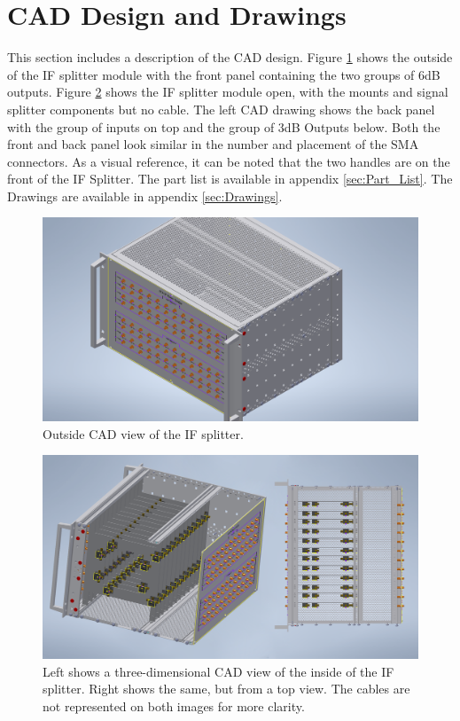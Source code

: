 \documentclass[12pt,a4paper,oneside]{article}
\begin{document}
\section{CAD Design and Drawings}
\label{sec:CAD}
This section includes a description of the CAD design. Figure \ref{fig:CAD_outside} shows the outside of the IF splitter module with the front panel containing the two groups of 6dB outputs. Figure \ref{fig:CAD_inside} shows the IF splitter module open, with the mounts and signal splitter components but no cable. The left CAD drawing shows the back panel with the group of inputs on top and the group of 3dB Outputs below. Both the front and back panel look similar in the number and placement of the SMA connectors. As a visual reference, it can be noted that the two handles are on the front of the IF Splitter. The part list is available in appendix \ref{sec:Part_List}. The Drawings are available in appendix \ref{sec:Drawings}.

\hfill \break

%
\begin{figure}[H]
\centering
\includegraphics[width=1\linewidth]{figures/CAD_outside.png}
\caption{Outside CAD view of the IF splitter.}
\label{fig:CAD_outside}
\end{figure}
%

%
\begin{figure}[H]
\centering
\includegraphics[width=1\linewidth]{figures/CAD_inside.png}
\caption{Left shows a three-dimensional CAD view of the inside of the IF splitter. Right shows the same, but from a top view. The cables are not represented on both images for more clarity.}
\label{fig:CAD_inside}
\end{figure}
%
\end{document}
